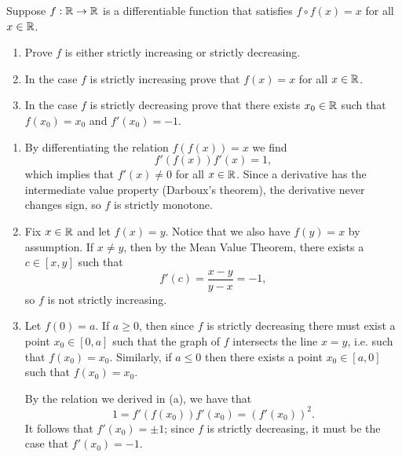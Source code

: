 \begin{problem}
Suppose $f: \mathbb{R} \to \mathbb{R}$ is a differentiable function that satisfies $f \circ f(x) = x$ for all $x \in \mathbb{R}$.
\begin{enumerate}
    \item[(a)] Prove $f$ is either strictly increasing or strictly decreasing.
    \item[(b)] In the case $f$ is strictly increasing prove that $f(x) = x$ for all $x \in \mathbb{R}$.
    \item[(c)] In the case $f$ is strictly decreasing prove that there exists $x_0 \in \mathbb{R}$ such that $f(x_0) = x_0$ and $f'(x_0) = -1$.
\end{enumerate}
\begin{solution}
\begin{enumerate}
    \item[(a)] By differentiating the relation $f(f(x)) = x$ we find
    $$ f'(f(x)) f'(x) = 1, $$
    which implies that $f'(x) \neq 0$ for all $x \in \mathbb{R}$. Since a derivative has the intermediate value property (Darboux's theorem), the derivative never changes sign, so $f$ is strictly monotone.
    \item[(b)] Fix $x \in \mathbb{R}$ and let $f(x) = y$. Notice that we also have $f(y) = x$ by assumption. If $x \neq y$, then by the Mean Value Theorem, there exists a $c \in [x,y]$ such that
    $$ f'(c) = \frac{x - y}{y - x} = -1, $$
    so $f$ is not strictly increasing.
    \item[(c)] Let $f(0) = a$. If $a \geq 0$, then since $f$ is strictly decreasing there must exist a point $x_0 \in [0,a]$ such that the graph of $f$ intersects the line $x = y$, i.e. such that $f(x_0) = x_0$. Similarly, if $a \leq 0$ then there exists a point $x_0 \in [a,0]$ such that $f(x_0) = x_0$.
    
    By the relation we derived in (a), we have that
    $$ 1 = f'(f(x_0)) f'(x_0) = (f'(x_0))^2. $$
    It follows that $f'(x_0) = \pm 1$; since $f$ is strictly decreasing, it must be the case that $f'(x_0) = -1$.
\end{enumerate}
\end{solution}
\end{problem}

